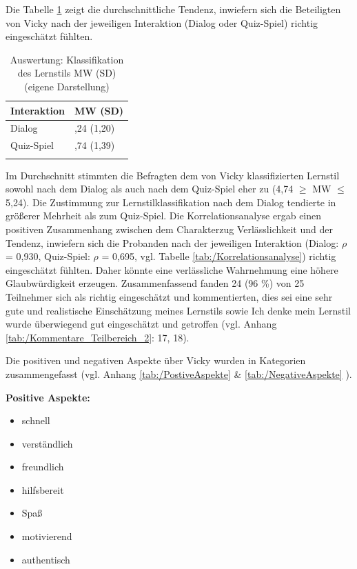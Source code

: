 Die Tabelle \ref{tab:/Klassifikation_des_Lernstils} zeigt die durchschnittliche Tendenz, inwiefern sich die Beteiligten von Vicky nach der jeweiligen 
Interaktion (Dialog oder Quiz-Spiel) richtig eingeschätzt fühlten.
\begingroup
\footnotesize 
\begin{longtable}{|m{5cm}|m{5cm}|}
    \hline
    \rowcolor[HTML]{EFEFEF} 
    \centering \textbf{Interaktion} &\centering  \arraybackslash \textbf{MW (SD)}\\    \hline \hline
    \centering  Dialog  &  \centering  \arraybackslash  5,24 (1,20)                       \\ \hline
    \centering Quiz-Spiel  &  \centering  \arraybackslash  4,74 (1,39)    \\ \hline
    \caption[Auswertung: Klassifikation des Lernstils MW (SD)]{Auswertung: Klassifikation des Lernstils MW (SD) (eigene Darstellung)} 
    \label{tab:/Klassifikation_des_Lernstils}
\end{longtable}
\endgroup

Im Durchschnitt stimmten die Befragten dem von Vicky klassifizierten Lernstil sowohl nach dem Dialog
als auch nach dem Quiz-Spiel eher zu (4,74 $\geq$ MW $\leq$ 5,24). 
Die Zustimmung zur Lernstilklassifikation nach dem Dialog tendierte in größerer Mehrheit als zum Quiz-Spiel. Die Korrelationsanalyse
ergab einen positiven Zusammenhang zwischen dem Charakterzug Verlässlichkeit und der Tendenz, inwiefern sich die 
Probanden nach der jeweiligen Interaktion (Dialog: $\rho$ = 0,930, Quiz-Spiel:
$\rho$ = 0,695, vgl. Tabelle \ref{tab:/Korrelationsanalyse}) richtig eingeschätzt fühlten. Daher könnte eine verlässliche Wahrnehmung 
eine höhere Glaubwürdigkeit erzeugen.
Zusammenfassend fanden 24 (96 \%) von 25 Teilnehmer sich als richtig eingeschätzt und kommentierten, 
dies sei eine \glqq sehr gute und realistische Einschätzung
meines Lernstils\grqq{} sowie \glqq Ich denke mein Lernstil wurde überwiegend gut eingeschätzt und getroffen\grqq{} (vgl. Anhang \ref{tab:/Kommentare_Teilbereich_2}: 17, 18).


Die positiven und negativen Aspekte über Vicky wurden in Kategorien zusammengefasst (vgl. Anhang \ref{tab:/PostiveAspekte} \& \ref{tab:/NegativeAspekte} ).

\textbf{Positive Aspekte:}

\begin{minipage}[t]{0.5\textwidth}
\begin{itemize}
    \item schnell
    \item verständlich
   \item freundlich
 \item hilfsbereit \\
\end{itemize}
\end{minipage}
\hfill
\begin{minipage}[t]{0.5\textwidth}
    \begin{itemize}
   \item Spaß 
   \item motivierend
 \item authentisch\\
\end{itemize}
\end{minipage}

